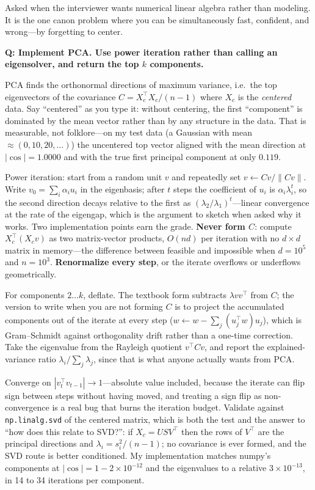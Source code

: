 Asked when the interviewer wants numerical linear algebra rather than modeling. It is the one canon problem where you can be simultaneously fast, confident, and wrong---by forgetting to center.

\begin{interviewq}
\textbf{Q: Implement PCA. Use power iteration rather than calling an eigensolver, and return the top $k$ components.}

 \quad {} \quad \badgefreq{\freqmed}

\stronganswer

PCA finds the orthonormal directions of maximum variance, i.e.\ the top eigenvectors of the covariance $C = X_c^\top X_c/(n-1)$ where $X_c$ is the \emph{centered} data. Say ``centered'' as you type it: without centering, the first ``component'' is dominated by the mean vector rather than by any structure in the data. That is measurable, not folklore---on my test data (a Gaussian with mean $\approx (0, 10, 20, \ldots)$) the uncentered top vector aligned with the mean direction at $|\cos| = 1.0000$ and with the true first principal component at only $0.119$.

Power iteration: start from a random unit $v$ and repeatedly set $v \leftarrow Cv/\|Cv\|$. Write $v_0 = \sum_i \alpha_i u_i$ in the eigenbasis; after $t$ steps the coefficient of $u_i$ is $\alpha_i \lambda_i^t$, so the second direction decays relative to the first as $(\lambda_2/\lambda_1)^t$---linear convergence at the rate of the eigengap, which is the argument to sketch when asked why it works. Two implementation points earn the grade. \textbf{Never form $C$}: compute $X_c^\top (X_c v)$ as two matrix-vector products, $O(nd)$ per iteration with no $d \times d$ matrix in memory---the difference between feasible and impossible when $d = 10^5$ and $n = 10^3$. \textbf{Renormalize every step}, or the iterate overflows or underflows geometrically.

For components $2 \ldots k$, deflate. The textbook form subtracts $\lambda vv^\top$ from $C$; the version to write when you are not forming $C$ is to project the accumulated components out of the iterate at every step ($w \leftarrow w - \sum_j (u_j^\top w)u_j$), which is Gram--Schmidt against orthogonality drift rather than a one-time correction. Take the eigenvalue from the Rayleigh quotient $v^\top C v$, and report the explained-variance ratio $\lambda_i / \sum_j \lambda_j$, since that is what anyone actually wants from PCA.

Converge on $|v_t^\top v_{t-1}| \to 1$---absolute value included, because the iterate can flip sign between steps without having moved, and treating a sign flip as non-convergence is a real bug that burns the iteration budget. Validate against \texttt{np.linalg.svd} of the centered matrix, which is both the test and the answer to ``how does this relate to SVD?'': if $X_c = U S V^\top$ then the rows of $V^\top$ are the principal directions and $\lambda_i = s_i^2/(n-1)$; no covariance is ever formed, and the SVD route is better conditioned. My implementation matches numpy's components at $|\cos| = 1 - 2\times10^{-12}$ and the eigenvalues to a relative $3 \times 10^{-13}$, in 14 to 34 iterations per component.


\end{interviewq}
